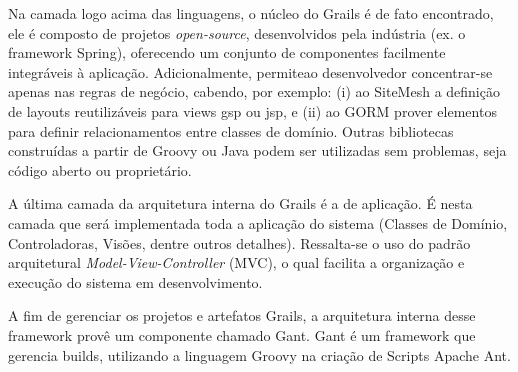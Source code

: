 Na camada logo acima das linguagens, o núcleo do Grails é de fato encontrado, ele é composto de projetos \textit{open-source}, desenvolvidos pela indústria (ex. o framework Spring), oferecendo um conjunto de componentes facilmente integráveis à aplicação. Adicionalmente, permiteao desenvolvedor concentrar-se apenas nas regras de negócio, cabendo, por exemplo: (i) ao SiteMesh a definição de layouts reutilizáveis para views gsp ou jsp, e (ii) ao GORM prover elementos para definir relacionamentos entre classes de domínio. Outras bibliotecas construídas a partir de Groovy ou Java podem ser utilizadas sem problemas, seja código aberto ou proprietário.

A última camada da arquitetura interna do Grails é a de aplicação. É nesta camada que será implementada toda a aplicação do sistema (Classes de Domínio, Controladoras, Visões, dentre outros detalhes). Ressalta-se o uso do padrão arquitetural \textit{Model-View-Controller} (MVC), o qual facilita a organização e execução do sistema em desenvolvimento.

A fim de gerenciar os projetos e artefatos Grails, a arquitetura interna desse framework provê um componente chamado Gant. Gant é um framework que gerencia builds, utilizando a linguagem Groovy na criação de Scripts Apache
Ant.













